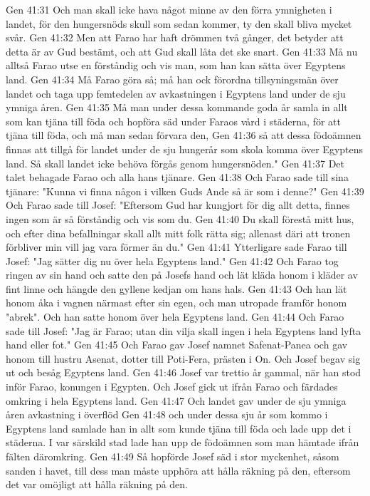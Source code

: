 Gen 41:31  Och man skall icke hava något minne av den förra ymnigheten i landet, för den hungersnöds skull som sedan kommer, ty den skall bliva mycket svår.
Gen 41:32  Men att Farao har haft drömmen två gånger, det betyder att detta är av Gud bestämt, och att Gud skall låta det ske snart.
Gen 41:33  Må nu alltså Farao utse en förståndig och vis man, som han kan sätta över Egyptens land.
Gen 41:34  Må Farao göra så; må han ock förordna tillsyningsmän över landet och taga upp femtedelen av avkastningen i Egyptens land under de sju ymniga åren.
Gen 41:35  Må man under dessa kommande goda år samla in allt som kan tjäna till föda och hopföra säd under Faraos vård i städerna, för att tjäna till föda, och må man sedan förvara den,
Gen 41:36  så att dessa födoämnen finnas att tillgå för landet under de sju hungerår som skola komma över Egyptens land. Så skall landet icke behöva förgås genom hungersnöden."
Gen 41:37  Det talet behagade Farao och alla hans tjänare.
Gen 41:38  Och Farao sade till sina tjänare: "Kunna vi finna någon i vilken Guds Ande så är som i denne?"
Gen 41:39  Och Farao sade till Josef: "Eftersom Gud har kungjort för dig allt detta, finnes ingen som är så förståndig och vis som du.
Gen 41:40  Du skall förestå mitt hus, och efter dina befallningar skall allt mitt folk rätta sig; allenast däri att tronen förbliver min vill jag vara förmer än du."
Gen 41:41  Ytterligare sade Farao till Josef: "Jag sätter dig nu över hela Egyptens land."
Gen 41:42  Och Farao tog ringen av sin hand och satte den på Josefs hand och lät kläda honom i kläder av fint linne och hängde den gyllene kedjan om hans hals.
Gen 41:43  Och han lät honom åka i vagnen närmast efter sin egen, och man utropade framför honom "abrek". Och han satte honom över hela Egyptens land.
Gen 41:44  Och Farao sade till Josef: "Jag är Farao; utan din vilja skall ingen i hela Egyptens land lyfta hand eller fot."
Gen 41:45  Och Farao gav Josef namnet Safenat-Panea och gav honom till hustru Asenat, dotter till Poti-Fera, prästen i On. Och Josef begav sig ut och besåg Egyptens land.
Gen 41:46  Josef var trettio år gammal, när han stod inför Farao, konungen i Egypten. Och Josef gick ut ifrån Farao och färdades omkring i hela Egyptens land.
Gen 41:47  Och landet gav under de sju ymniga åren avkastning i överflöd
Gen 41:48  och under dessa sju år som kommo i Egyptens land samlade han in allt som kunde tjäna till föda och lade upp det i städerna. I var särskild stad lade han upp de födoämnen som man hämtade ifrån fälten däromkring.
Gen 41:49  Så hopförde Josef säd i stor myckenhet, såsom sanden i havet, till dess man måste upphöra att hålla räkning på den, eftersom det var omöjligt att hålla räkning på den.
